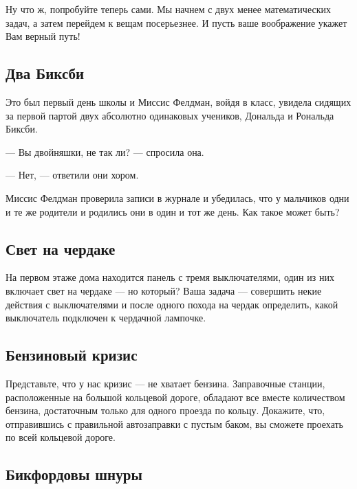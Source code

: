 Ну что ж, попробуйте теперь сами. Мы начнем с двух менее математических задач, а затем перейдем к вещам посерьезнее.
И пусть ваше воображение укажет Вам верный путь!


\subsection*{Два Биксби} %



Это был первый день школы и Миссис Фелдман, войдя в класс, увидела сидящих за первой партой двух абсолютно одинаковых учеников, Дональда и Рональда Биксби. 


--- Вы двойняшки, не так ли? --- спросила она.

--- Нет, --- ответили они хором.


Миссис Фелдман проверила записи в журнале и убедилась, что у мальчиков одни и те же родители и родились они в один и тот же день. Как такое может быть?




\subsection*{Свет на чердаке}   %



На первом этаже дома находится панель с тремя выключателями, один из них включает свет на чердаке --- но который?  
Ваша задача --- совершить некие действия с выключателями и после одного похода на чердак определить, какой выключатель подключен к чердачной лампочке.


\subsection*{Бензиновый кризис} %



Представьте, что у нас кризис --- не хватает бензина. 
Заправочные станции, расположенные на большой кольцевой дороге, обладают все вместе  количеством бензина, достаточным только для одного проезда по кольцу. Докажите, что, отправившись с правильной автозаправки с пустым баком, вы сможете проехать по всей кольцевой дороге.


\subsection*{Бикфордовы шнуры} %



